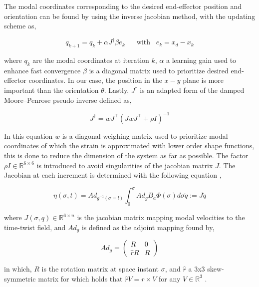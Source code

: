 The modal coordinates corresponding to the desired end-effector position and orientation can be found by using the inverse jacobian method, with the updating scheme as,

\begin{equation}
    q_{k+1} = q_k + \alpha J^\dagger \beta e_k \hspace{20pt} \text{with} \hspace{10pt}  e_k = x_d - x_k
\end{equation}

where $q_k$ are the modal coordinates at iteration $k$, $\alpha$ a learning gain used to enhance fast convergence $\beta$ is a diagonal matrix used to prioritize desired end-effector coordinates. In our case, the position in the $x-y$ plane is more important than the orientation $\theta$. Lastly, $J^\dagger$ is an adapted form of the damped Moore–Penrose pseudo inverse defined as,

\begin{equation}
    J^\dagger = wJ^\top(JwJ^\top + \rho I)^{-1}
    \label{eq2:pseudoinverse}
\end{equation}

In this equation $w$ is a diagonal weighing matrix used to prioritize modal coordinates of which the strain is approximated with lower order shape functions, this is done to reduce the dimension of the system as far as possible. The factor $\rho I \in \mathbb{R}^{6 \times 6}$ is introduced to avoid singularities of the jacobian matrix $J$. The Jacobian at each increment is determined with the following equation \cite{Caasenbrood2020},

\begin{equation}
\eta(\sigma,t) = Ad_{g^{-1}(\sigma = l)} \int_{0}^{\sigma} Ad_g B_a \Phi(\sigma) d\sigma \dot{q} := J\dot{q}
\end{equation}

where $J(\sigma,q) \in \mathbb{R}^{6 \times n}$ is the jacobian matrix mapping modal velocities to the time-twist field, and $Ad_g$ is defined as the adjoint mapping found by,


\begin{equation}
    Ad_g = \begin{pmatrix} R & 0 \\ \hat{r}R & R \end{pmatrix}
\end{equation}

in which, $R$ is the rotation matrix at space instant $\sigma$, and $\hat{r}$ a 3x3 skew-symmetric matrix for which holds that $\hat{r}V = r \times V$ for any $V \in \mathbb{R}^3$ \cite{Boyer2019}.

